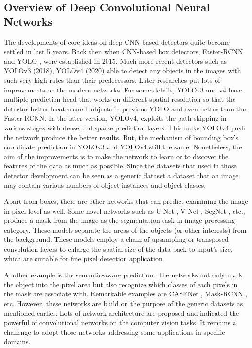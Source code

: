 \documentclass[default,pdflatex,iicol]{sn-jnl}%
\begin{document}
\subsection{Overview of Deep Convolutional Neural Networks}
The developments of core ideas on deep CNN-based detectors quite become settled in last 5 years. Back then when CNN-based box detectors, Faster-RCNN \cite{fasterrcnn} and YOLO \cite{redmonyolov1}, were established in 2015. Much more recent detectors such as YOLOv3 \cite{redmonyolov3} (2018), YOLOv4 \cite{alexyyolov4} (2020) able to detect any objects in the images with such very high rates than their predecessors. Later researches put lots of improvements on the modern networks. For some details, YOLOv3 and v4 have multiple prediction head that works on different spatial resolution so that the detector better locates small objects in previous YOLO and even better than the Faster-RCNN. In the later version, YOLOv4, exploits the path skipping in various stages with dense and sparse prediction layers. This make YOLOv4 push the network produce the better results. But, the mechanism of bounding box's coordinate prediction in YOLOv3 and YOLOv4 still the same. Nonetheless, the aim of the improvements is to make the network to learn or to discover the features of the data as much as possible. Since the datasets that used in those detector development can be seen as a generic dataset \textemdash a dataset that an image may contain various numbers of object instances and object classes. 

Apart from boxes, there are other networks that can predict examining the image in pixel level as well. Some novel networks such as U-Net \cite{unet}, V-Net \cite{vnet}, SegNet \cite{segnet}, etc., produce a mask from the image as the segmentation task in image processing category. These models separate the areas of the objects (or other interests) from the background. These models employ a chain of upsampling or transposed convolution layers to enlarge the spatial size of the data back to input's size, which are suitable for fine pixel detection application.

Another example is the semantic-aware prediction. The networks not only mark the object into the pixel area but also recognize which classes of each pixels in the mask are associate with. Remarkable examples are CASENet \cite{casenet}, Mask-RCNN \cite{maskrcnn}, etc. However, these networks are build on the purpose of the generic datasets as mentioned earlier. Lots of network architecture are proposed and indicated the powerful of convolutional networks on the computer vision tasks. It remains a challenge to adopt those networks addressing some applications in specific domains.
\end{document}
